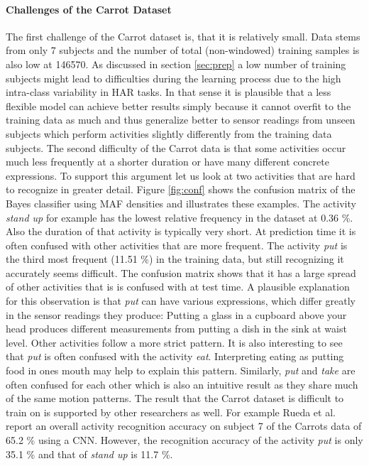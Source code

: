 \documentclass[11pt,titlepage,oneside,openany]{book}
\begin{document}
\paragraph{Challenges of the Carrot Dataset}
The first challenge of the Carrot dataset is, that it is relatively small. Data stems from only 7 subjects and the number of total (non-windowed) training samples is also low at 146570. As discussed in section \ref{sec:prep} a low number of training subjects might lead to difficulties during the learning process due to the high intra-class variability in HAR tasks. In that sense it is plausible that a less flexible model can achieve better results simply because it cannot overfit to the training data as much and thus generalize better to sensor readings from unseen subjects which perform activities slightly differently from the training data subjects. The second difficulty of the Carrot data is that some activities occur much less frequently at a shorter duration or have many different concrete expressions. To support this argument let us look at two activities that are hard to recognize in greater detail. Figure \ref{fig:conf} shows the confusion matrix of the Bayes classifier using MAF densities and illustrates these examples. The activity \emph{stand up} for example has the lowest relative frequency in the dataset at 0.36 \%. Also the duration of that activity is typically very short. At prediction time it is often confused with other activities that are more frequent. The activity \emph{put} is the third most frequent (11.51 \%) in the training data, but still recognizing it accurately seems difficult. The confusion matrix shows that it has a large spread of other activities that is is confused with at test time. A plausible explanation for this observation is that \emph{put} can have various expressions, which differ greatly in the sensor readings they produce: Putting a glass in a cupboard above your head produces different measurements from putting a dish in the sink at waist level. Other activities follow a more strict pattern. It is also interesting to see that \emph{put} is often confused with the activity \emph{eat}. Interpreting eating as putting food in ones mouth may help to explain this pattern. Similarly, \emph{put} and \emph{take} are often confused for each other which is also an intuitive result as they share much of the same motion patterns. The result that the Carrot dataset is difficult to train on is supported by other researchers as well. For example Rueda et al. \cite{rueda_combining_2019} report an overall activity recognition accuracy on subject 7 of the Carrots data of 65.2 \% using a CNN. However, the recognition accuracy of the activity \emph{put} is only 35.1 \% and that of \emph{stand up} is 11.7 \%.
\end{document}
